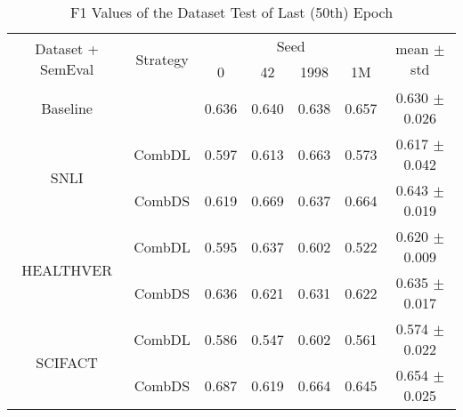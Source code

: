 \begin{table}[h]
    \centering
    \caption{F1 Values of the Dataset Test of Last (50th) Epoch}
    \label{tab:my-table}
    \begin{tabular}{|c|c||cccc|c|}
    \hline
    \multirow{2}{*}{Dataset + SemEval} & \multirow{2}{*}{Strategy} & \multicolumn{4}{c|}{Seed}                                                                    & \multirow{2}{*}{mean $\pm$ std} \\ \cline{3-6}
                                       &                           & \multicolumn{1}{c|}{0}     & \multicolumn{1}{c|}{42}    & \multicolumn{1}{c|}{1998}  & 1M    &                                 \\ \hline\hline
    Baseline                           &                           & \multicolumn{1}{c|}{0.636} & \multicolumn{1}{c|}{0.640} & \multicolumn{1}{c|}{0.638} & 0.657 & 0.630 $\pm$ 0.026               \\ \hline\hline
    \multirow{2}{*}{SNLI}              & CombDL                    & \multicolumn{1}{c|}{0.597} & \multicolumn{1}{c|}{0.613} & \multicolumn{1}{c|}{0.663} & 0.573 & 0.617 $\pm$ 0.042               \\ \cline{2-7} 
                                       & CombDS                    & \multicolumn{1}{c|}{0.619} & \multicolumn{1}{c|}{0.669} & \multicolumn{1}{c|}{0.637} & 0.664 & 0.643 $\pm$ 0.019               \\ \hline
    \multirow{2}{*}{HEALTHVER}         & CombDL                    & \multicolumn{1}{c|}{0.595} & \multicolumn{1}{c|}{0.637} & \multicolumn{1}{c|}{0.602} & 0.522 & 0.620 $\pm$ 0.009               \\ \cline{2-7} 
                                       & CombDS                    & \multicolumn{1}{c|}{0.636} & \multicolumn{1}{c|}{0.621} & \multicolumn{1}{c|}{0.631} & 0.622 & 0.635 $\pm$ 0.017               \\ \hline
    \multirow{2}{*}{SCIFACT}           & CombDL                    & \multicolumn{1}{c|}{0.586} & \multicolumn{1}{c|}{0.547} & \multicolumn{1}{c|}{0.602} & 0.561 & 0.574 $\pm$ 0.022               \\ \cline{2-7} 
                                       & CombDS                    & \multicolumn{1}{c|}{0.687} & \multicolumn{1}{c|}{0.619} & \multicolumn{1}{c|}{0.664} & 0.645 & 0.654 $\pm$ 0.025               \\ \hline\hline
    

\end{tabular}
\end{table}
